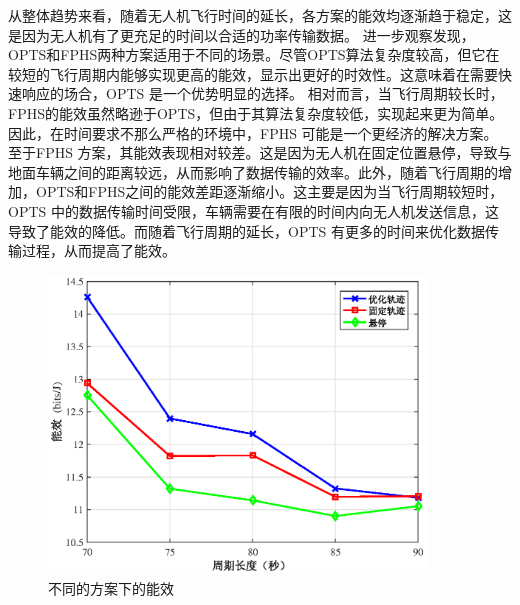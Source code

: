 从整体趋势来看，随着无人机飞行时间的延长，各方案的能效均逐渐趋于稳定，这是因为无人机有了更充足的时间以合适的功率传输数据。
进一步观察发现，OPTS和FPHS两种方案适用于不同的场景。尽管OPTS算法复杂度较高，但它在较短的飞行周期内能够实现更高的能效，显示出更好的时效性。这意味着在需要快速响应的场合，OPTS 是一个优势明显的选择。
相对而言，当飞行周期较长时，FPHS的能效虽然略逊于OPTS，但由于其算法复杂度较低，实现起来更为简单。因此，在时间要求不那么严格的环境中，FPHS 可能是一个更经济的解决方案。
至于FPHS 方案，其能效表现相对较差。这是因为无人机在固定位置悬停，导致与地面车辆之间的距离较远，从而影响了数据传输的效率。此外，随着飞行周期的增加，OPTS和FPHS之间的能效差距逐渐缩小。这主要是因为当飞行周期较短时，OPTS 中的数据传输时间受限，车辆需要在有限的时间内向无人机发送信息，这导致了能效的降低。而随着飞行周期的延长，OPTS 有更多的时间来优化数据传输过程，从而提高了能效。

\begin{figure}[H]
\centering
\includegraphics[width=10cm]{figures//chap4//不同的方案下的能效.eps}
\caption{不同的方案下的能效}
\label{不同的方案下的能效}
\end{figure}

